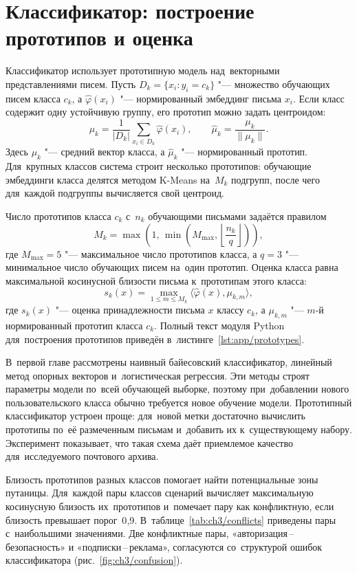 \section{Классификатор: построение прототипов и оценка}\label{sec:ch3/clf}

Классификатор использует прототипную модель над~векторными представлениями
писем. Пусть \( D_k=\{x_i:y_i=c_k\} \) "--- множество обучающих писем класса
\( c_k \), а \( \widehat{\varphi}(x_i) \) "--- нормированный эмбеддинг письма
\( x_i \). Если класс содержит одну устойчивую группу, его прототип можно
задать центроидом:
\[
    \mu_k=\frac{1}{|D_k|}\sum_{x_i\in D_k}\widehat{\varphi}(x_i),
    \qquad
    \widehat{\mu}_k=\frac{\mu_k}{\lVert \mu_k\rVert}.
\]
Здесь \( \mu_k \) "--- средний вектор класса, а \( \widehat{\mu}_k \) "---
нормированный прототип. Для~крупных классов система строит несколько прототипов:
обучающие эмбеддинги класса делятся методом K-Means на~\( M_k \) подгрупп,
после чего для~каждой подгруппы вычисляется свой центроид.

Число прототипов класса \( c_k \) с~\( n_k \) обучающими письмами задаётся
правилом
\[
    M_k=\max\left(1,\,
    \min\left(M_{\max},
    \left\lfloor\frac{n_k}{q}\right\rfloor\right)\right),
\]
где \( M_{\max}=5 \) "--- максимальное число прототипов класса, а \( q=3 \)
"--- минимальное число обучающих писем на~один прототип. Оценка класса равна
максимальной косинусной близости письма к~прототипам этого класса:
\[
    s_k(x)=\max_{1\leqslant m\leqslant M_k}
    \bigl\langle \widehat{\varphi}(x), \mu_{k,m}\bigr\rangle,
\]
где \( s_k(x) \) "--- оценка принадлежности письма \(x\) классу \(c_k\),
а \( \mu_{k,m} \) "--- \(m\)-й нормированный прототип класса \(c_k\).
Полный текст модуля Python для~построения прототипов приведён
в~листинге~\ref{lst:app/prototypes}.

В~первой главе рассмотрены наивный байесовский классификатор, линейный метод
опорных векторов и~логистическая регрессия. Эти методы строят параметры модели
по~всей обучающей выборке, поэтому при~добавлении нового пользовательского
класса обычно требуется новое обучение модели. Прототипный классификатор
устроен проще: для~новой метки достаточно вычислить прототипы по~её размеченным
письмам и~добавить их к~существующему набору. Эксперимент показывает, что такая
схема даёт приемлемое качество для~исследуемого почтового архива.

Близость прототипов разных классов помогает найти потенциальные зоны путаницы.
Для~каждой пары классов сценарий вычисляет максимальную косинусную близость
их~прототипов и~помечает пару как конфликтную, если близость превышает
порог~0{,}9. В~таблице~\ref{tab:ch3/conflicts} приведены пары с~наибольшими
значениями. Две конфликтные пары, «авторизация\,--\,безопасность» и
«подписки\,--\,реклама», согласуются со~структурой ошибок классификатора
(рис.~\ref{fig:ch3/confusion}).

